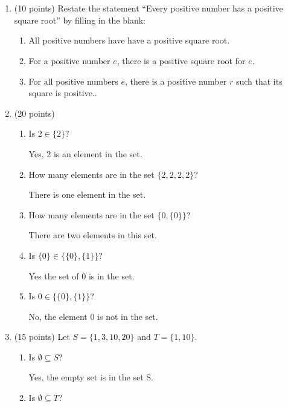\documentclass[12pt]{article}
\begin{document}
\section*{}
\begin{enumerate}
	\item (10 points) Restate the statement ``Every positive number has a positive square root'' by filling in the blank:
	      \begin{enumerate}
		      \item All positive numbers have have a positive square root.
		      \item For a positive number \( e \), there is a positive
		            square root for \( e \).
		      \item For all positive numbers \( e \), there is a positive
		            number \( r \) such that its square is positive..
	      \end{enumerate}
	\item (20 points)
	      \begin{enumerate}
		      \item Is \( 2 \in \{2\} \)?
		            
		            Yes, 2 is an element in the set.
		      \item How many elements are in the set \( \{2, 2, 2, 2\} \)?
		            
		            There is one element in the set.
		      \item How many elements are in the set \( \{0, \{0\}\} \)?
		            
		            There are two elements in this set.
		      \item Is \( \{0\} \in \{\{0\}, \{1\}\} \)?
		            
		            Yes the set of 0 is in the set.
		      \item Is \( 0 \in \{\{0\}, \{1\}\} \)?
		            
		            No, the element 0 is not in the set.
	      \end{enumerate}
	\item (15 points) Let \( S = \{1, 3, 10, 20\} \) and \( T = \{1, 10\} \).
	      \begin{enumerate}
		      \item Is \( \emptyset \subseteq S \)?
		            
		            Yes, the empty set is in the set S.
		      \item Is \( \emptyset \subseteq T \)?
		            

\end{enumerate}
\end{enumerate}
\end{document}
